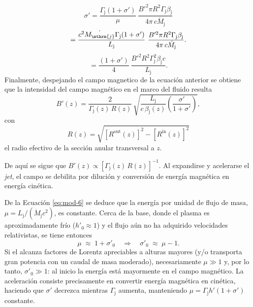 	\begin{equation*}
	\sigma'=\frac{\Gamma_\mathrm{j} (1+\sigma')}{\mu}~\frac{B'^2\pi R^2\Gamma_\mathrm{j}\beta_\mathrm{j}}{4\pi\,c\dot{M_\mathrm{j}}}
	\end{equation*}
	\begin{equation}
	=\frac{c^2 \dot{M_\mthrm{j}}\Gamma_\mathrm{j} (1+\sigma')}{L_\mathrm{j}}~\frac{B'^2\pi R^2\Gamma_\mathrm{j}\beta_\mathrm{j}}{4\pi\,c\dot{M_\mathrm{j}}}.
	\end{equation}
	\begin{equation*}
	=\frac{ (1+\sigma')}{4}~\frac{B'^2 R^2\Gamma_\mathrm{j}^2\beta_\mathrm{j} c}{L_\mathrm{j}}.
	\end{equation*}
	Finalmente, despejando el campo magnetico de la ecuaci\'on anterior se obtiene que la intensidad del campo magnético en el marco del fluido resulta
\begin{equation}\label{eq:mod-9}
    B'(z)=\frac{2}{\Gamma_{\mathrm{j}}(z)\,R(z)}\,
    \sqrt{\frac{L_{\mathrm{j}}}{c\,\beta_{\mathrm{j}}(z)}\left(\frac{\sigma'}{1+\sigma'}\right)},
\end{equation}
con
\begin{equation}\label{eq:mod-10}
    R(z)=\sqrt{[R^{\mathrm{out}}(z)]^2-[R^{\mathrm{in}}(z)]^2}
\end{equation}
 el radio efectivo de la sección anular transversal a $z$.

	De aquí se sigue que $B'(z)\propto [\Gamma_{\mathrm{j}}(z)\,R(z)]^{-1}$.
	Al expandirse y acelerarse el \textit{jet}, el campo se debilita por dilución y conversión de energía magnética en energía cinética.

	De la Ecuación \eqref{eq:mod-6} se deduce que la energía por unidad de flujo de masa, $\mu=L_{\mathrm{j}}/(\dot{M}_{\mathrm{j}} c^2)$, es constante.
	Cerca de la base, donde el plasma es aproximadamente frío ($h'_0 \approx 1$) y el flujo aún no ha adquirido velocidades relativistas, se tiene entonces
\[
    \mu \;\approx\; 1+\sigma'_0 \quad \Rightarrow\quad \sigma'_0 \;\approx\; \mu-1 .
\]
	Si el \jet alcanza factores de Lorentz apreciables a alturas mayores (y/o transporta gran potencia con un caudal de masa moderado), necesariamente $\mu\gg1$ y, por lo tanto, $\sigma'_0\gg1$: al inicio la energía está mayormente en el campo magnético.
	La aceleración consiste precisamente en convertir energía magnética en cinética, haciendo que $\sigma'$ decrezca mientras $\Gamma_{\mathrm{j}}$ aumenta, manteniendo $\mu=\Gamma_{\mathrm{j}} h' (1+\sigma')$ constante.



